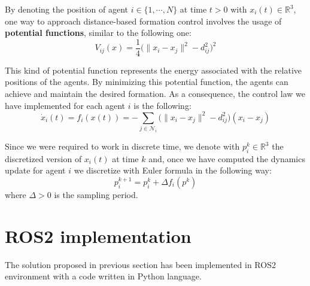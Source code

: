 \documentclass[a4paper,11pt,oneside]{book}
\begin{document}
By denoting the position of agent $i \in \{1, \cdots, N\}$ at time $t>0$ with $x_i(t) \in \mathbb{R}^3$, one way to approach distance-based formation control involves the usage of \textbf{potential functions}, similar to the following one:
\begin{equation}
V_{ij}(x)  = \frac{1}{4} \bigg( \lVert x_i - x_j \rVert^2 - d_{ij}^2 \bigg)^2
\label{Formation_potential}
\end{equation}

This kind of potential function represents the energy associated with the relative positions of the agents. By minimizing this potential function, the agents can achieve and maintain the desired formation.
As a consequence, the control law we have implemented for each agent $i$ is the following:
\begin{equation}
\dot{x}_i(t) = f_i(x(t)) = - \sum_{j \in \mathcal{N}_i} \bigg( \lVert x_i - x_j \rVert^2 - d_{ij}^2 \bigg) (x_i - x_j )
\label{Dynamics_no_collision_avoidance}
\end{equation}

Since we were required to work in discrete time, we denote with $p_i^k \in \mathbb{R}^3$ the discretized version of $x_i(t)$ at time $k$ and, once we have computed the dynamics update for agent $i$ we discretize with Euler formula in the following way:
\begin{equation}
p_i^{k+1} = p_i^{k} + \Delta f_i(p^k)
\end{equation}
where $\Delta > 0$ is the sampling period.

\section{ROS2 implementation}
The solution proposed in previous section has been implemented in ROS2 environment with a code written in Python language.
\end{document}
